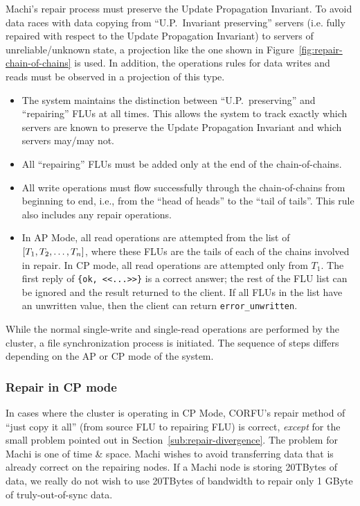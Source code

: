 \documentclass[preprint,10pt]{sigplanconf}
\begin{document}
Machi's repair process must preserve the Update Propagation
Invariant.  To avoid data races with data copying from
``U.P.~Invariant preserving'' servers (i.e. fully repaired with
respect to the Update Propagation Invariant)
to servers of unreliable/unknown state, a
projection like the one shown in
Figure~\ref{fig:repair-chain-of-chains} is used.  In addition, the
operations rules for data writes and reads must be observed in a
projection of this type.

\begin{itemize}

\item The system maintains the distinction between ``U.P.~preserving''
  and ``repairing'' FLUs at all times.  This allows the system to
  track exactly which servers are known to preserve the Update
  Propagation Invariant and which servers may/may not.

\item All ``repairing'' FLUs must be added only at the end of the
  chain-of-chains.

\item All write operations must flow successfully through the
  chain-of-chains from beginning to end, i.e., from the ``head of
  heads'' to the ``tail of tails''.  This rule also includes any
  repair operations.

\item In AP Mode, all read operations are attempted from the list of
$[T_1,\-T_2,\-\ldots,\-T_n]$, where these FLUs are the tails of each of the
chains involved in repair.
In CP mode, all read operations are attempted only from $T_1$.
The first reply of {\tt \{ok, <<...>>\}} is a correct answer;
the rest of the FLU list can be ignored and the result returned to the
client.  If all FLUs in the list have an unwritten value, then the
client can return {\tt error\_unwritten}.

\end{itemize}

While the normal single-write and single-read operations are performed
by the cluster, a file synchronization process is initiated.  The
sequence of steps differs depending on the AP or CP mode of the system.

\subsubsection{Repair in CP mode}

In cases where the cluster is operating in CP Mode,
CORFU's repair method of ``just copy it all'' (from source FLU to repairing
FLU) is correct, {\em except} for the small problem pointed out in
Section~\ref{sub:repair-divergence}.  The problem for Machi is one of
time \& space.  Machi wishes to avoid transferring data that is
already correct on the repairing nodes.  If a Machi node is storing
20TBytes of data, we really do not wish to use 20TBytes of bandwidth
to repair only 1 GByte of truly-out-of-sync data.
\end{document}
